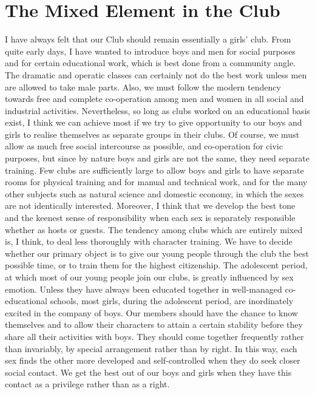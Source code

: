 \chapter{The Mixed Element in the Club}

I have always felt that our Club should remain essentially
a girls’ club. From quite early days, I have wanted to
introduce boys and men for social purposes and for
certain educational work, which is best done from a
community angle. The dramatic and operatic classes can
certainly not do the best work unless men are allowed to
take male parts. Also, we must follow the modern
tendency towards free and complete co-operation among
men and women in all social and industrial activities.
Nevertheless, so long as clubs worked on an educational
basis exist, I think we can achieve most if we try to give
opportunity to our boys and girls to realise themselves as
separate groups in their clubs. Of course, we must allow
as much free social intercourse as possible, and
co-operation for civic purposes, but since by nature boys and girls
are not the same, they need separate training. Few clubs
are sufficiently large to allow boys and girls to have
separate rooms for physical training and for manual and
technical work, and for the many other subjects such as
natural science and domestic economy, in which the
sexes are not identically interested. Moreover, I think
that we develop the best tone and the keenest sense of
responsibility when each sex is separately responsible
whether as hosts or guests. The tendency among clubs
which are entirely mixed is, I think, to deal less
thoroughly with character training. We have to decide
whether our primary object is to give our young people
through the club the best possible time, or to train them
for the highest citizenship. The adolescent period, at
which most of our young people join our clubs, is greatly
influenced by sex emotion. Unless they have always been
educated together in well-managed co-educational
schools, most girls, during the adolescent period, are
inordinately excited in the company of boys. Our members
should have the chance to know themselves and to allow
their characters to attain a certain stability before they
share all their activities with boys. They should come
together frequently rather than invariably, by special
arrangement rather than by right. In this way, each sex
finds the other more developed and self-controlled when
they do seek closer social contact. We get the best out of
our boys and girls when they have this contact as a privilege
rather than as a right.

